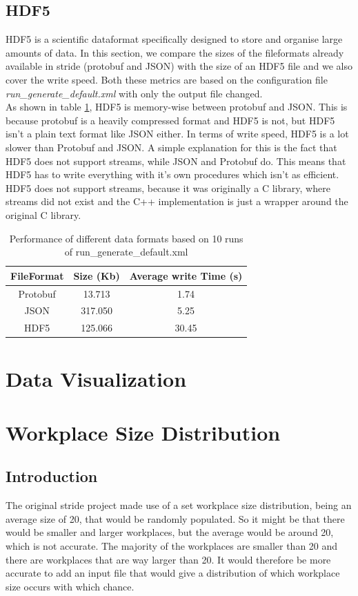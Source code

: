 \documentclass[runningheads]{llncs}
\begin{document}
	\subsection{HDF5}
	HDF5 is a scientific dataformat specifically designed to store and organise large amounts of data. In this section, we compare the sizes of the fileformats already available in stride (protobuf and JSON) with the size of an HDF5 file and we also cover the write speed. Both these metrics are based on the configuration file \textit{run\_generate\_default.xml} with only the output file changed.
	\\
	As shown in table \ref{table:1}, HDF5 is memory-wise between protobuf and JSON. This is because protobuf is a heavily compressed format and HDF5 is not, but HDF5 isn't a plain text format like JSON either. In terms of write speed, HDF5 is a lot slower than Protobuf and JSON. A simple explanation for this is the fact that HDF5 does not support streams, while JSON and Protobuf do. This means that HDF5 has to write everything with it's own procedures which isn't as efficient. HDF5 does not support streams, because it was originally a C library, where streams did not exist and the C++ implementation is just a wrapper around the original C library.
	\begin{table}
		\centering
		\begin{tabular}{|c|c|c|}
			\hline
			\textbf{FileFormat} & \textbf{Size (Kb)}  & \textbf{Average write Time (s)}\\ \hline
			Protobuf & 13.713 & 1.74\\ \hline
			JSON & 317.050 & 5.25\\ \hline
			HDF5 & 125.066 & 30.45 \\ \hline
		\end{tabular}
		\caption{Performance of different data formats based on 10 runs of run\_generate\_default.xml}
		\label{table:1}
	\end{table}
	\section{Data Visualization}
	\section{Workplace Size Distribution}
	\subsection{Introduction}
	The original stride project made use of a set workplace size distribution, being an average size of 20, that would be randomly populated. So it might be that there would be smaller and larger workplaces, but the average would be around 20, which is not accurate. The majority of the workplaces are smaller than 20 and there are workplaces that are way larger than 20. It would therefore be more accurate to add an input file that would give a distribution of which workplace size occurs with which chance.
\end{document}
